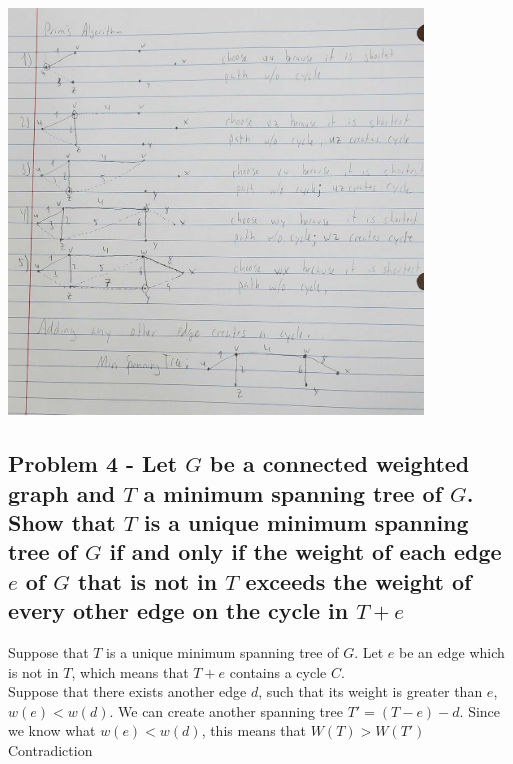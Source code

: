 \documentclass[10pt,a4paper]{article}
\begin{document}
\includegraphics[width = 11cm]{prims}\\

\subsection*{Problem 4 - Let $G$ be a connected weighted graph and $T$ a minimum spanning tree of $G$. Show that $T$ is a unique minimum spanning tree of $G$ if and only if the weight of each edge $e$ of $G$ that is not in $T$ exceeds the weight of every other edge on the cycle in $T + e$}
Suppose that $T$ is a unique minimum spanning tree of $G$. Let $e$ be an edge which is not in $T$, which means that $T + e$ contains a cycle $C$. \\ Suppose that there exists another edge $d$, such that its weight is greater than $e$, $w(e) < w(d)$. We can create another spanning tree $T\prime = (T - e) - d$. Since we know what $w(e) < w(d)$, this means that $W(T) > W(T\prime)$ Contradiction\\
\end{document}
